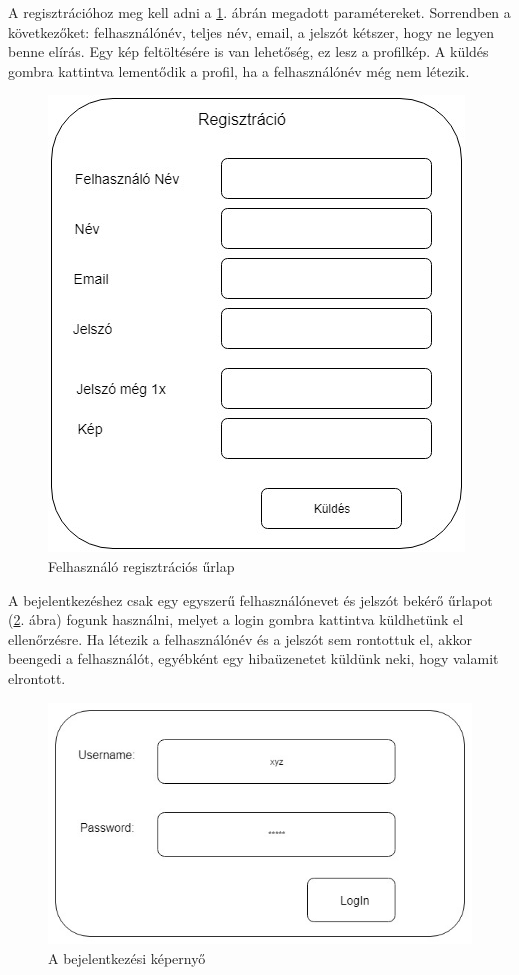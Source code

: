 A regisztrációhoz meg kell adni a \ref{fig:registration}. ábrán megadott paramétereket. Sorrendben a következőket: felhasználónév, teljes név, email, a jelszót kétszer, hogy ne legyen benne elírás. Egy kép feltöltésére is van lehetőség, ez lesz a profilkép. A küldés gombra kattintva lementődik a profil, ha a felhasználónév még nem létezik.

\begin{figure}
\centering
\includegraphics[scale=0.5]{kepek/registration.jpg}
\caption{Felhasználó regisztrációs űrlap}
\label{fig:registration}
\end{figure}


A bejelentkezéshez csak egy egyszerű felhasználónevet és jelszót bekérő űrlapot (\ref{fig:login}. ábra) fogunk használni, melyet a login gombra kattintva küldhetünk el ellenőrzésre. Ha létezik a felhasználónév és a jelszót sem rontottuk el, akkor beengedi a felhasználót, egyébként egy hibaüzenetet küldünk neki, hogy valamit elrontott.

\begin{figure}
\centering
\includegraphics[scale=0.5]{kepek/login.jpg}
\caption{A bejelentkezési képernyő}
\label{fig:login}
\end{figure}

